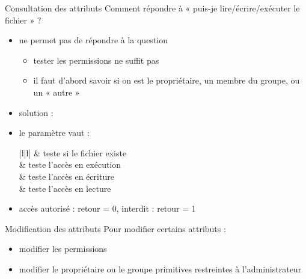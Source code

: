 \begin {frame} {Consultation des attributs}
    Comment répondre à « puis-je lire/écrire/exécuter le fichier » ?

    \begin {itemize}
	\item {} ne permet pas de répondre à la question
	    \begin {itemize}
		\item tester les permissions ne suffit pas
		\item il faut d'abord savoir si on est le propriétaire,
		    un membre du groupe, ou un « autre »
	    \end {itemize}

	\item solution :


	\item le paramètre  vaut :

	    \ctableau {\fC} {|l|l|} {
		\rca {} & teste si le fichier existe \\
		\rcb {} & teste l'accès en exécution \\
		\rca {} & teste l'accès en écriture \\
		\rcb {} & teste l'accès en lecture \\
	    }

	\item accès autorisé : retour = 0, interdit : retour = 1

    \end {itemize}
\end {frame}

\begin {frame} {Modification des attributs}
    Pour modifier certains attributs :
    \begin {itemize}
	\item modifier les permissions

	\item modifier le propriétaire ou le groupe
	    \vspace* {-4mm}
	    \implique primitives restreintes à l'administrateur
    \end {itemize}
\end {frame}

